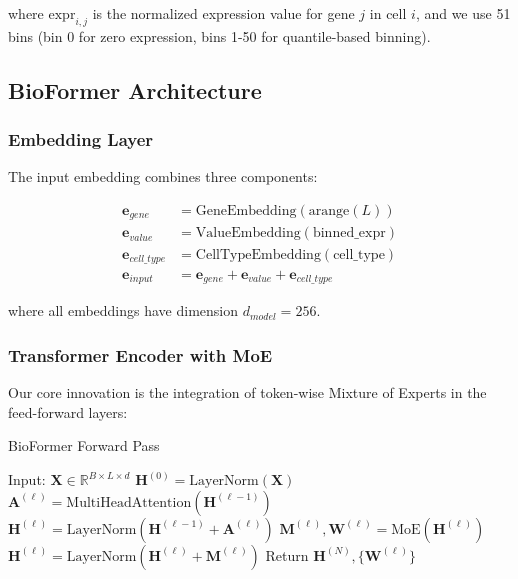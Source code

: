 where $\text{expr}_{i,j}$ is the normalized expression value for gene $j$ in cell $i$, and we use 51 bins (bin 0 for zero expression, bins 1-50 for quantile-based binning).

\subsection{BioFormer Architecture}

\subsubsection{Embedding Layer}

The input embedding combines three components:

\begin{align}
\mathbf{e}_{gene} &= \text{GeneEmbedding}(\text{arange}(L)) \\
\mathbf{e}_{value} &= \text{ValueEmbedding}(\text{binned\_expr}) \\
\mathbf{e}_{cell\_type} &= \text{CellTypeEmbedding}(\text{cell\_type}) \\
\mathbf{e}_{input} &= \mathbf{e}_{gene} + \mathbf{e}_{value} + \mathbf{e}_{cell\_type}
\end{align}

where all embeddings have dimension $d_{model} = 256$.

\subsubsection{Transformer Encoder with MoE}

Our core innovation is the integration of token-wise Mixture of Experts in the feed-forward layers:

\begin{algorithm}
\caption{BioFormer Forward Pass}
\begin{algorithmic}
\STATE Input: $\mathbf{X} \in \mathbb{R}^{B \times L \times d}$
\STATE $\mathbf{H}^{(0)} = \text{LayerNorm}(\mathbf{X})$
    \STATE $\mathbf{A}^{(\ell)} = \text{MultiHeadAttention}(\mathbf{H}^{(\ell-1)})$
    \STATE $\mathbf{H}^{(\ell)} = \text{LayerNorm}(\mathbf{H}^{(\ell-1)} + \mathbf{A}^{(\ell)})$
    \STATE $\mathbf{M}^{(\ell)}, \mathbf{W}^{(\ell)} = \text{MoE}(\mathbf{H}^{(\ell)})$
    \STATE $\mathbf{H}^{(\ell)} = \text{LayerNorm}(\mathbf{H}^{(\ell)} + \mathbf{M}^{(\ell)})$
\ENDFOR
\STATE Return $\mathbf{H}^{(N)}, \{\mathbf{W}^{(\ell)}\}$
\end{algorithmic}
\end{algorithm}

